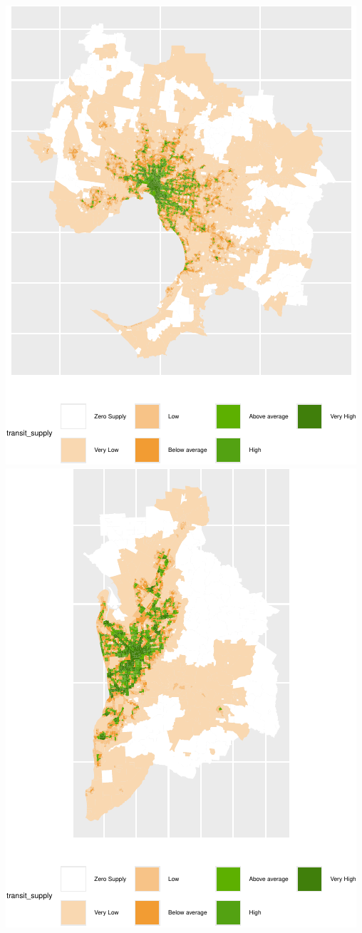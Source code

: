 \documentclass[preprint, 3p,
authoryear]{elsarticle} %
\begin{document}
\includegraphics{Leveraging_GTFS_to_assess_transit_supply_Transport_Geography_files/figure-latex/Australian_cities_2021-1.pdf}
\includegraphics{Leveraging_GTFS_to_assess_transit_supply_Transport_Geography_files/figure-latex/Australian_cities_2021-2.pdf}
\end{document}

